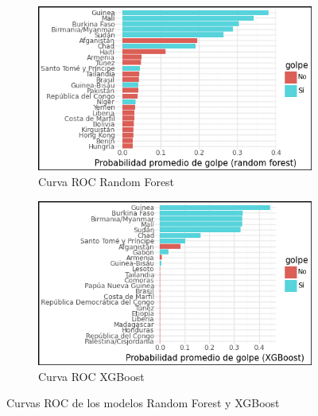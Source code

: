 \documentclass{article}
\begin{document}
\begin{figure}[htbp]
  \centering
  \begin{subfigure}[b]{0.49\textwidth}
    \includegraphics[width=\textwidth]{16_prob_rf_comp.png}
    \caption{Curva ROC Random Forest \label{fig:prob_rf}}
  \end{subfigure}
  \hfill
  \begin{subfigure}[b]{0.49\textwidth}
    \includegraphics[width=\textwidth]{17_prob_xgb_comp.png}
    \caption{Curva ROC XGBoost \label{fig:prob_xgb}}
  \end{subfigure}
  \caption{Curvas ROC de los modelos Random Forest y XGBoost \label{fig:roc_comp}}
\end{figure}
\end{document}

